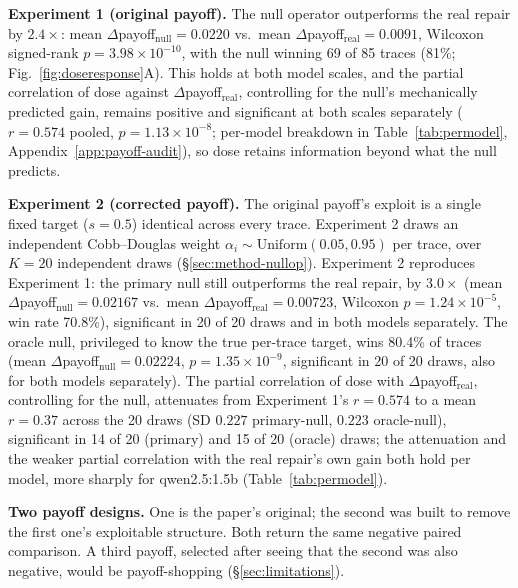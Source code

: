 \documentclass{article}
\begin{document}
\textbf{Experiment 1 (original payoff).} The null operator outperforms the real repair by
$2.4\times$: mean $\Delta$payoff$_{\mathrm{null}}=0.0220$ vs.\ mean
$\Delta$payoff$_{\mathrm{real}}=0.0091$, Wilcoxon signed-rank $p=3.98\times10^{-10}$, with the
null winning 69 of 85 traces (81\%; Fig.~\ref{fig:doseresponse}A). This holds at both model
scales, and the partial correlation of dose against $\Delta$payoff$_{\mathrm{real}}$, controlling
for the null's mechanically predicted gain, remains positive and significant at both scales
separately ($r=0.574$ pooled, $p=1.13\times10^{-8}$; per-model breakdown in
Table~\ref{tab:permodel}, Appendix~\ref{app:payoff-audit}), so dose retains information beyond
what the null predicts.

\textbf{Experiment 2 (corrected payoff).} The original payoff's exploit is a single fixed target
($s=0.5$) identical across every trace. Experiment 2 draws an independent Cobb--Douglas weight
$\alpha_i\sim\mathrm{Uniform}(0.05,0.95)$ per trace, over $K=20$ independent draws
(\S\ref{sec:method-nullop}). Experiment 2 reproduces Experiment 1: the primary null still
outperforms the real repair, by $3.0\times$ (mean $\Delta$payoff$_{\mathrm{null}}=0.02167$ vs.\
mean $\Delta$payoff$_{\mathrm{real}}=0.00723$, Wilcoxon $p=1.24\times10^{-5}$, win rate 70.8\%),
significant in 20 of 20 draws and in both models separately. The oracle null, privileged to know
the true per-trace target, wins 80.4\% of traces (mean $\Delta$payoff$_{\mathrm{null}}=0.02224$,
$p=1.35\times10^{-9}$, significant in 20 of 20 draws, also for both models separately). The
partial correlation of dose with $\Delta$payoff$_{\mathrm{real}}$, controlling for the null,
attenuates from Experiment 1's $r=0.574$ to a mean $r=0.37$ across the 20 draws (SD $0.227$
primary-null, $0.223$ oracle-null), significant in 14 of 20 (primary) and 15 of 20 (oracle)
draws; the attenuation and the weaker partial correlation with the real repair's own gain both
hold per model, more sharply for qwen2.5:1.5b (Table~\ref{tab:permodel}).

\textbf{Two payoff designs.} One is the paper's original; the second was built to remove the
first one's exploitable structure. Both return the same negative paired comparison. A third
payoff, selected after seeing that the second was also negative, would be payoff-shopping
(\S\ref{sec:limitations}).
\end{document}
